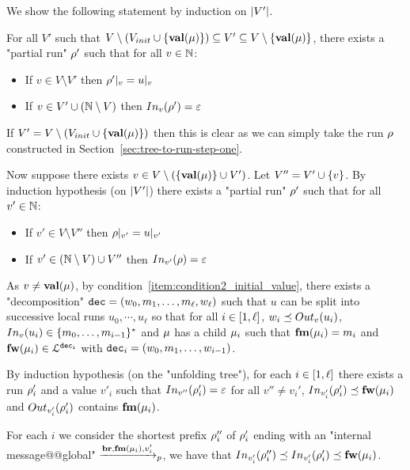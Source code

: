 	We show the following statement by induction on $\size{V'}$.
	
	For all $V'$ such that $V \setminus (V_{init} \cup \set{\valuelabel{\node}}) \subseteq V' \subseteq V \setminus \set{\valuelabel{\node}}$, there exists a "partial run" $\run'$ such that for all $v \in \nats$:
	\begin{itemize}		
		\item If $v \in V \setminus V'$ then $\vproj{v}{\run'} = \vproj{v}{u}$
		
		\item If $v \in V' \cup (\nats \setminus V)$ then $\vinput{v}{\run'} = \epsilon$
	\end{itemize}  

If $V' = V \setminus (V_{init} \cup \set{\valuelabel{\node}})$ then this is clear as we can simply take the run $\run$ constructed in Section~\ref{sec:tree-to-run-step-one}.

Now suppose there exists $v \in V \setminus (\set{\valuelabel{\node}} \cup V')$. Let $V'' = V' \cup \set{v}$. By induction hypothesis (on $\size{V'}$) there exists a "partial run" $\run'$ such that for all $v' \in \nats$:
\begin{itemize}
	\item If $v' \in V \setminus V''$ then $\vproj{v'}{\run} = \vproj{v'}{u}$
	
	\item If $v' \in (\nats \setminus V) \cup V''$ then $\vinput{v'}{\run} = \epsilon$
\end{itemize}

As $v \neq \valuelabel{\node}$, by condition~\ref{item:condition2_initial_value}, there exists a "decomposition" $\decsymb = (w_0, m_1, \ldots, m_\ell, w_\ell)$ such that $u$ can be split into successive local runs $u_0, \cdots, u_\ell$ so that for all $i \in \nset{1}{\ell}$, $w_i \subword \voutput{v}{u_i}$, $\vinput{v}{u_i} \in \set{m_0, \ldots, m_{i-1}}^*$ and $\node$ has a child $\node_i$ such that $\followlabelmessage{\mu_i} = m_i$ and $\followlabelword{\node_i} \in \langdec{\decsymb_i}$ with $\decsymb_i = (w_0, m_1, \ldots, w_{i-1})$.

By induction hypothesis (on the "unfolding tree"), for each $i \in\nset{1}{\ell}$ there exists a run $\run'_i$ and a value $v'_i$ such that $\vinput{v''}{\run'_i} = \epsilon$ for all $v'' \neq v_i'$, $\vinput{v'_i}{\run'_i} \subword \followlabelword{\node_i}$ and $\voutput{v'_i}{\run'_i}$ contains $\followlabelmessage{\node_i}$.

For each $i$ we consider the shortest prefix $\run''_i$ of $\run'_i$ ending with an "internal message@@global" $\intmessage{\followlabelmessage{\node_i}}{v'_i}$, we have that $\vinput{v'_i}{\run''_i} \subword \vinput{v'_i}{\run'_i} \subword \followlabelword{\node_i}$.

